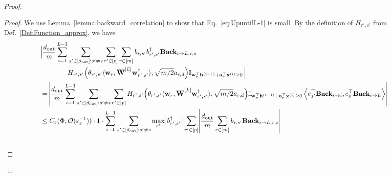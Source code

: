 \begin{claim}
\begin{proof}
\begin{proof}
					We use Lemma~\ref{lemma:backward_correlation} to show that Eq.~\ref{eq:UpuntilL-1} is small. By the definition of $H_{r',s'}$ from Def.~\ref{Def:Function_approx}, we have
					\begingroup \allowdisplaybreaks
					\begin{align*}
						&\Big|\frac{\dout }{m} \sum_{i=1}^{L-1}  \sum_{s' \in [\dout ]: s' \ne s} \sum_{r' \in [p]} \sum_{r \in [m]}  b_{r, s'} b_{r', s'}^{\dagger} \mathbf{Back}_{i \to L, r, s} \\& \quad \quad \quad \quad H_{r', s'}\Big(\theta_{r', s'} \langle \mathbf{w}_{r}, \overline{\mathbf{W}}^{[L]} \mathbf{w}_{r', s'}^{\dagger}\rangle , \sqrt{m/2} a_{r, d}\Big) \mathbb{I}_{\mathbf{w}_r^{\top} \mathbf{h}^{(i-1)} + \mathbf{a}_r^{\top} \mathbf{x}^{(i)} \ge 0}\Big| 
						\\& = \abs{\frac{\dout }{m} \sum_{i=1}^{L-1} \sum_{s' \in [\dout ]: s' \ne s} \sum_{r' \in [p]} H_{r', s'}\Big(\theta_{r', s'} \langle \mathbf{w}_{r}, \overline{\mathbf{W}}^{[L]} \mathbf{w}_{r', s'}^{\dagger}\rangle , \sqrt{m/2} a_{r, d}\Big) \mathbb{I}_{\mathbf{w}_r^{\top} \mathbf{h}^{(i-1)} + \mathbf{a}_r^{\top} \mathbf{x}^{(i)} \ge 0} \left\langle e_{s'}^{\top} \mathbf{Back}_{i \to i}, e_s^{\top} \mathbf{Back}_{i \to L}\right\rangle}
						\\&
						\le C_\varepsilon(\Phi, \mathcal{O}( \varepsilon_x^{-1})) \cdot 1 \cdot \sum_{i=1}^{L-1}  \sum_{s' \in [\dout ]: s' \ne s} \max_{r'}  \abs{b_{r', s'}^{\dagger}}  \sum_{r' \in [p]}  \abs{\frac{\dout }{m}  \sum_{r \in [m]}  b_{r, s'}  \mathbf{Back}_{i \to L, r, s}} \\&

\end{align*}
\end{proof}
\end{proof}
\end{claim}
